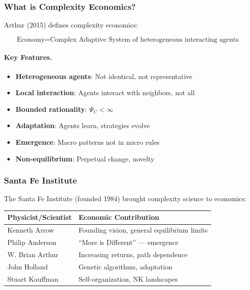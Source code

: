 \subsubsection{What is Complexity Economics?}

Arthur (2015) defines complexity economics:

\begin{equation}
\boxed{
\text{Economy} = \text{Complex Adaptive System of heterogeneous interacting agents}
}
\label{eq:complexity-def}
\end{equation}

\paragraph{Key Features.}
\begin{itemize}
    \item \textbf{Heterogeneous agents}: Not identical, not representative
    \item \textbf{Local interaction}: Agents interact with neighbors, not all
    \item \textbf{Bounded rationality}: $\Psi_C < \infty$
    \item \textbf{Adaptation}: Agents learn, strategies evolve
    \item \textbf{Emergence}: Macro patterns not in micro rules
    \item \textbf{Non-equilibrium}: Perpetual change, novelty
\end{itemize}

\subsubsection{Santa Fe Institute}

The Santa Fe Institute (founded 1984) brought complexity science to economics:

\begin{center}
\renewcommand{\arraystretch}{1.3}
\begin{tabular}{|l|l|}
\hline
\textbf{Physicist/Scientist} & \textbf{Economic Contribution} \\
\hline
Kenneth Arrow & Founding vision, general equilibrium limits \\
Philip Anderson & ``More is Different'' --- emergence \\
W. Brian Arthur & Increasing returns, path dependence \\
John Holland & Genetic algorithms, adaptation \\
Stuart Kauffman & Self-organization, NK landscapes \\
\hline
\end{tabular}
\end{center}

